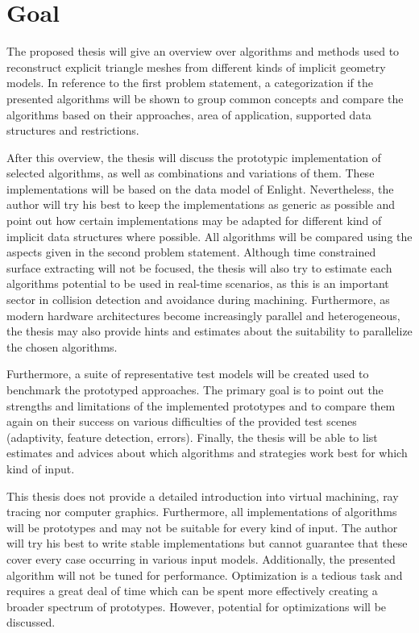 
\section{Goal}

The proposed thesis will give an overview over algorithms and methods used to reconstruct explicit triangle meshes from different kinds of implicit geometry models. In reference to the first problem statement, a categorization if the presented algorithms will be shown to group common concepts and compare the algorithms based on their approaches, area of application, supported data structures and restrictions.

After this overview, the thesis will discuss the prototypic implementation of selected algorithms, as well as combinations and variations of them. These implementations will be based on the data model of Enlight. Nevertheless, the author will try his best to keep the implementations as generic as possible and point out how certain implementations may be adapted for different kind of implicit data structures where possible. All algorithms will be compared using the aspects given in the second problem statement. Although time constrained surface extracting will not be focused, the thesis will also try to estimate each algorithms potential to be used in real-time scenarios, as this is an important sector in collision detection and avoidance during machining. Furthermore, as modern hardware architectures become increasingly parallel and heterogeneous, the thesis may also provide hints and estimates about the suitability to parallelize the chosen algorithms.

Furthermore, a suite of representative test models will be created used to benchmark the prototyped approaches. The primary goal is to point out the strengths and limitations of the implemented prototypes and to compare them again on their success on various difficulties of the provided test scenes (\eg adaptivity, feature detection, errors). Finally, the thesis will be able to list estimates and advices about which algorithms and strategies work best for which kind of input.

This thesis does not provide a detailed introduction into virtual machining, ray tracing nor computer graphics. Furthermore, all implementations of algorithms will be prototypes and may not be suitable for every kind of input. The author will try his best to write stable implementations but cannot guarantee that these cover every case occurring in various input models. Additionally, the presented algorithm will not be tuned for performance. Optimization is a tedious task and requires a great deal of time which can be spent more effectively creating a broader spectrum of prototypes. However, potential for optimizations will be discussed.
